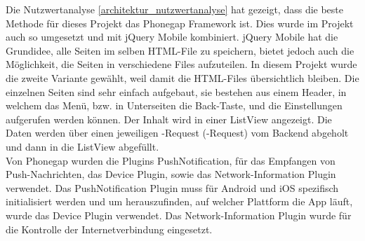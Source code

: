 Die Nutzwertanalyse \ref{architektur_nutzwertanalyse} hat gezeigt, dass die beste Methode für dieses Projekt das Phonegap Framework ist. Dies wurde im Projekt auch so umgesetzt und mit jQuery Mobile kombiniert. jQuery Mobile hat die Grundidee, alle Seiten im selben HTML-File zu speichern, bietet jedoch auch die Möglichkeit, die Seiten in verschiedene Files aufzuteilen. In diesem Projekt wurde die zweite Variante gewählt, weil damit die HTML-Files übersichtlich bleiben. Die einzelnen Seiten sind sehr einfach aufgebaut, sie bestehen aus einem Header, in welchem das Menü, bzw. in Unterseiten die Back-Taste, und die Einstellungen aufgerufen werden können. Der Inhalt wird in einer ListView angezeigt. Die Daten werden über einen jeweiligen -Request (-Request) vom Backend abgeholt und dann in die ListView abgefüllt.\\

Von Phonegap wurden die Plugins PushNotification, für das Empfangen von Push-Nachrichten, das Device Plugin, sowie das Network-Information Plugin verwendet. Das PushNotification Plugin muss für Android und iOS spezifisch initialisiert werden und um herauszufinden, auf welcher Plattform die App läuft, wurde das Device Plugin verwendet. Das Network-Information Plugin wurde für die Kontrolle der Internetverbindung eingesetzt.\\



